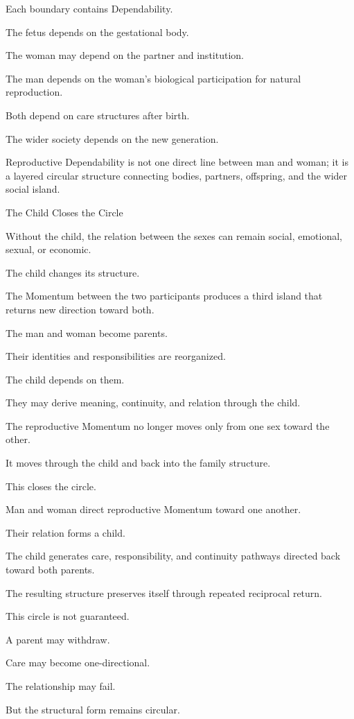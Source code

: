 Each boundary contains Dependability.

The fetus depends on the gestational body.

The woman may depend on the partner and institution.

The man depends on the woman’s biological participation for natural reproduction.

Both depend on care structures after birth.

The wider society depends on the new generation.

Reproductive Dependability is not one direct line between man and woman; it is a layered circular structure connecting bodies, partners, offspring, and the wider social island.

The Child Closes the Circle

Without the child, the relation between the sexes can remain social, emotional, sexual, or economic.

The child changes its structure.

The Momentum between the two participants produces a third island that returns new direction toward both.

The man and woman become parents.

Their identities and responsibilities are reorganized.

The child depends on them.

They may derive meaning, continuity, and relation through the child.

The reproductive Momentum no longer moves only from one sex toward the other.

It moves through the child and back into the family structure.

This closes the circle.

Man and woman direct reproductive Momentum toward one another.

Their relation forms a child.

The child generates care, responsibility, and continuity pathways directed back toward both parents.

The resulting structure preserves itself through repeated reciprocal return.

This circle is not guaranteed.

A parent may withdraw.

Care may become one-directional.

The relationship may fail.

But the structural form remains circular.

